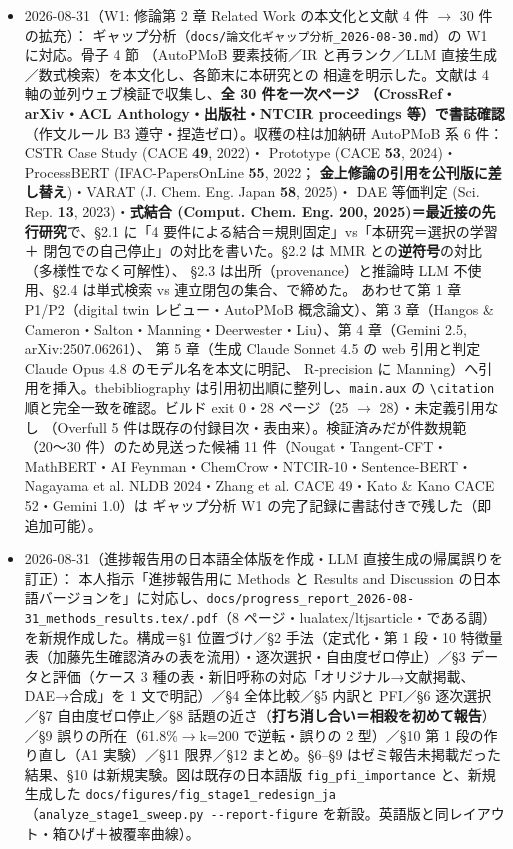 \documentclass[11pt,a4paper]{jsarticle}
\begin{document}
\begin{itemize}[nosep]
  \item 2026-08-31（W1: 修論第 2 章 Related Work の本文化と文献 4 件 $\to$ 30 件の拡充）：
    ギャップ分析（\texttt{docs/論文化ギャップ分析\_2026-08-30.md}）の W1 に対応。骨子 4 節
    （AutoPMoB 要素技術／IR と再ランク／LLM 直接生成／数式検索）を本文化し、各節末に本研究との
    相違を明示した。文献は 4 軸の並列ウェブ検証で収集し、\textbf{全 30 件を一次ページ
    （CrossRef・arXiv・ACL Anthology・出版社・NTCIR proceedings 等）で書誌確認}（作文ルール B3
    遵守・捏造ゼロ）。収穫の柱は加納研 AutoPMoB 系 6 件：CSTR Case Study (CACE {\bf 49}, 2022)・
    Prototype (CACE {\bf 53}, 2024)・ProcessBERT (IFAC-PapersOnLine {\bf 55}, 2022；
    \textbf{金上修論の引用を公刊版に差し替え})・VARAT (J. Chem. Eng. Japan {\bf 58}, 2025)・
    DAE 等価判定 (Sci. Rep. {\bf 13}, 2023)・\textbf{式結合 (Comput. Chem. Eng. {\bf 200},
    2025)＝最近接の先行研究}で、\S2.1 に「4 要件による結合＝規則固定」vs「本研究＝選択の学習＋
    閉包での自己停止」の対比を書いた。\S2.2 は MMR との\textbf{逆符号}の対比（多様性でなく可解性）、
    \S2.3 は出所（provenance）と推論時 LLM 不使用、\S2.4 は単式検索 vs 連立閉包の集合、で締めた。
    あわせて第 1 章 P1/P2（digital twin レビュー・AutoPMoB 概念論文）、第 3 章（Hangos \&
    Cameron・Salton・Manning・Deerwester・Liu）、第 4 章（Gemini 2.5, arXiv:2507.06261）、
    第 5 章（生成 Claude Sonnet 4.5 の web 引用と判定 Claude Opus 4.8 のモデル名を本文に明記、
    R-precision に Manning）へ引用を挿入。thebibliography は引用初出順に整列し、\texttt{main.aux}
    の \verb|\citation| 順と完全一致を確認。ビルド exit 0・28 ページ（25 $\to$ 28）・未定義引用なし
    （Overfull 5 件は既存の付録目次・表由来）。検証済みだが件数規範（20〜30 件）のため見送った候補
    11 件（Nougat・Tangent-CFT・MathBERT・AI Feynman・ChemCrow・NTCIR-10・Sentence-BERT・
    Nagayama et al. NLDB 2024・Zhang et al. CACE 49・Kato \& Kano CACE 52・Gemini 1.0）は
    ギャップ分析 W1 の完了記録に書誌付きで残した（即追加可能）。
  \item 2026-08-31（進捗報告用の日本語全体版を作成・LLM 直接生成の帰属誤りを訂正）：
    本人指示「進捗報告用に Methods と Results and Discussion の日本語バージョンを」に対応し、\texttt{docs/progress\_report\_2026-08-31\_methods\_results.tex/.pdf}（8 ページ・lualatex/ltjsarticle・である調）を新規作成した。構成＝\S1 位置づけ／\S2 手法（定式化・第 1 段・10 特徴量表（加藤先生確認済みの表を流用）・逐次選択・自由度ゼロ停止）／\S3 データと評価（ケース 3 種の表・新旧呼称の対応「オリジナル→文献掲載、DAE→合成」を 1 文で明記）／\S4 全体比較／\S5 内訳と PFI／\S6 逐次選択／\S7 自由度ゼロ停止／\S8 話題の近さ（\textbf{打ち消し合い＝相殺を初めて報告}）／\S9 誤りの所在（61.8\%$\to$k=200 で逆転・誤りの 2 型）／\S10 第 1 段の作り直し（A1 実験）／\S11 限界／\S12 まとめ。\S6--\S9 はゼミ報告未掲載だった結果、\S10 は新規実験。図は既存の日本語版 \texttt{fig\_pfi\_importance} と、新規生成した \texttt{docs/figures/fig\_stage1\_redesign\_ja}（\texttt{analyze\_stage1\_sweep.py -{}-report-figure} を新設。英語版と同レイアウト・箱ひげ＋被覆率曲線）。

\end{itemize}
\end{document}
